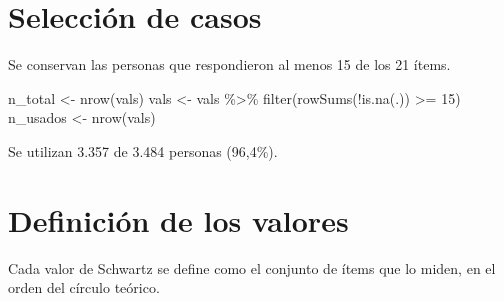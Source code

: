 \documentclass[
  spanish,
  a4paper,
  oneside]{scrbook}
\newenvironment{Shaded}{\begin{snugshade}}{\end{snugshade}}
\newcommand{\DecValTok}[1]{\textcolor[rgb]{0.68,0.00,0.00}{#1}}
\newcommand{\FunctionTok}[1]{\textcolor[rgb]{0.28,0.35,0.67}{#1}}
\newcommand{\NormalTok}[1]{\textcolor[rgb]{0.00,0.23,0.31}{#1}}
\newcommand{\OtherTok}[1]{\textcolor[rgb]{0.00,0.23,0.31}{#1}}
\newcommand{\SpecialCharTok}[1]{\textcolor[rgb]{0.37,0.37,0.37}{#1}}
\begin{document}
\section{Selección de casos}\label{selecciuxf3n-de-casos}

Se conservan las personas que respondieron al menos 15 de los 21 ítems.

\begin{Shaded}
\begin{Highlighting}[]
\NormalTok{n\_total  }\OtherTok{\textless{}{-}} \FunctionTok{nrow}\NormalTok{(vals)}
\NormalTok{vals     }\OtherTok{\textless{}{-}}\NormalTok{ vals }\SpecialCharTok{\%\textgreater{}\%} \FunctionTok{filter}\NormalTok{(}\FunctionTok{rowSums}\NormalTok{(}\SpecialCharTok{!}\FunctionTok{is.na}\NormalTok{(.)) }\SpecialCharTok{\textgreater{}=} \DecValTok{15}\NormalTok{)}
\NormalTok{n\_usados }\OtherTok{\textless{}{-}} \FunctionTok{nrow}\NormalTok{(vals)}
\end{Highlighting}
\end{Shaded}

Se utilizan 3.357 de 3.484 personas (96,4\%).

\section{Definición de los valores}\label{definiciuxf3n-de-los-valores}

Cada valor de Schwartz se define como el conjunto de ítems que lo miden,
en el orden del círculo teórico.
\end{document}
